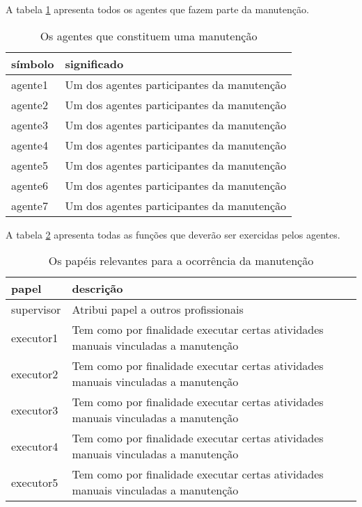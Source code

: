 A tabela \ref{agents} apresenta todos os agentes que fazem parte da manutenção. 
\begin{table}[H]
\centering
\begin{tabular}{|l|l|}
\hline
\textbf{símbolo} & \textbf{significado} \\ \hline
agente1 & Um dos agentes participantes da manutenção \\ \hline
agente2 & Um dos agentes participantes da manutenção \\ \hline
agente3 & Um dos agentes participantes da manutenção \\ \hline
agente4 & Um dos agentes participantes da manutenção \\ \hline
agente5 & Um dos agentes participantes da manutenção \\ \hline
agente6 & Um dos agentes participantes da manutenção \\ \hline
agente7 & Um dos agentes participantes da manutenção \\ \hline
\end{tabular}
\caption{Os agentes que constituem uma manutenção}
\label{agents}
\end{table}

 A tabela \ref{roles} apresenta todas as funções que deverão ser exercidas pelos agentes.

\begin{table}[H]
\centering
\begin{tabular}{|l|l|}
\hline
\textbf{papel} & \textbf{descrição} \\ \hline
supervisor & Atribui papel a outros profissionais \\ \hline
executor1 & Tem como por finalidade executar certas atividades manuais vinculadas a manutenção \\ \hline
executor2 & Tem como por finalidade executar certas atividades manuais vinculadas a manutenção \\ \hline
executor3 & Tem como por finalidade executar certas atividades manuais vinculadas a manutenção \\ \hline
executor4 & Tem como por finalidade executar certas atividades manuais vinculadas a manutenção \\ \hline
executor5 & Tem como por finalidade executar certas atividades manuais vinculadas a manutenção \\ \hline
\end{tabular}
\caption{Os papéis relevantes para a ocorrência da manutenção}
\label{roles}
\end{table}

